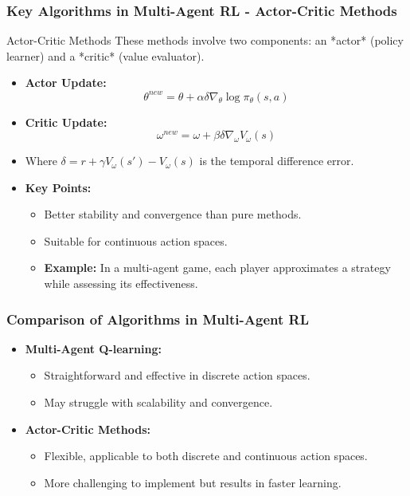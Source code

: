 \documentclass[aspectratio=169]{beamer}
\begin{document}
\begin{frame}[fragile]
    \frametitle{Key Algorithms in Multi-Agent RL - Actor-Critic Methods}
    \begin{block}{Actor-Critic Methods}
        These methods involve two components: an *actor* (policy learner) and a *critic* (value evaluator).
    \end{block}
    \begin{itemize}
        \item \textbf{Actor Update:}
        \begin{equation}
        \theta^{new} = \theta + \alpha \delta \nabla_{\theta} \log \pi_{\theta}(s, a)
        \end{equation}
        \item \textbf{Critic Update:}
        \begin{equation}
        \omega^{new} = \omega + \beta \delta \nabla_{\omega} V_{\omega}(s)
        \end{equation}
        \item Where \( \delta = r + \gamma V_{\omega}(s') - V_{\omega}(s) \) is the temporal difference error.
        \item \textbf{Key Points:}
        \begin{itemize}
            \item Better stability and convergence than pure methods.
            \item Suitable for continuous action spaces.
            \item \textbf{Example:} In a multi-agent game, each player approximates a strategy while assessing its effectiveness.
        \end{itemize}
    \end{itemize}
\end{frame}

\begin{frame}[fragile]
    \frametitle{Comparison of Algorithms in Multi-Agent RL}
    \begin{itemize}
        \item \textbf{Multi-Agent Q-learning:}
        \begin{itemize}
            \item Straightforward and effective in discrete action spaces.
            \item May struggle with scalability and convergence.
        \end{itemize}
        
        \item \textbf{Actor-Critic Methods:}
        \begin{itemize}
            \item Flexible, applicable to both discrete and continuous action spaces.
            \item More challenging to implement but results in faster learning.
        \end{itemize}
    \end{itemize}
\end{frame}
\end{document}
